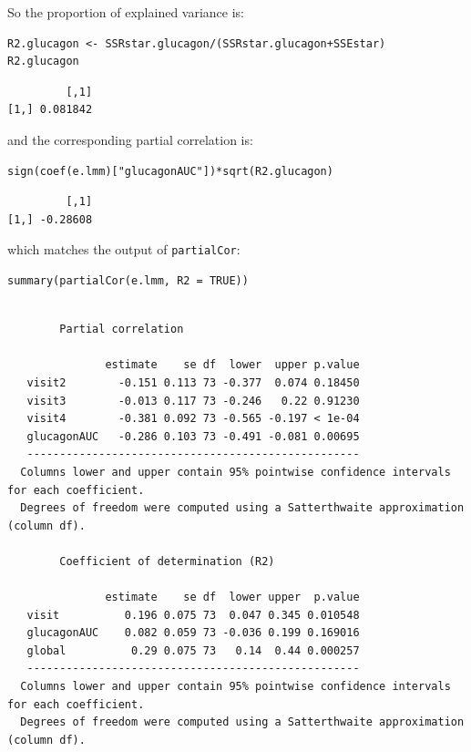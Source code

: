 \documentclass[12pt]{article}
\begin{document}
So the proportion of explained variance is:
\lstset{language=r,label= ,caption= ,captionpos=b,numbers=none}
\begin{lstlisting}
R2.glucagon <- SSRstar.glucagon/(SSRstar.glucagon+SSEstar)
R2.glucagon
\end{lstlisting}

\begin{verbatim}
         [,1]
[1,] 0.081842
\end{verbatim}


and the corresponding partial correlation is:
\lstset{language=r,label= ,caption= ,captionpos=b,numbers=none}
\begin{lstlisting}
sign(coef(e.lmm)["glucagonAUC"])*sqrt(R2.glucagon)
\end{lstlisting}

\begin{verbatim}
         [,1]
[1,] -0.28608
\end{verbatim}


which matches the output of \texttt{partialCor}:
\lstset{language=r,label= ,caption= ,captionpos=b,numbers=none}
\begin{lstlisting}
summary(partialCor(e.lmm, R2 = TRUE))
\end{lstlisting}

\begin{verbatim}

		Partial correlation 

               estimate    se df  lower  upper p.value
   visit2        -0.151 0.113 73 -0.377  0.074 0.18450
   visit3        -0.013 0.117 73 -0.246   0.22 0.91230
   visit4        -0.381 0.092 73 -0.565 -0.197 < 1e-04
   glucagonAUC   -0.286 0.103 73 -0.491 -0.081 0.00695
   --------------------------------------------------- 
  Columns lower and upper contain 95% pointwise confidence intervals for each coefficient.
  Degrees of freedom were computed using a Satterthwaite approximation (column df). 

		Coefficient of determination (R2)

               estimate    se df  lower upper  p.value
   visit          0.196 0.075 73  0.047 0.345 0.010548
   glucagonAUC    0.082 0.059 73 -0.036 0.199 0.169016
   global          0.29 0.075 73   0.14  0.44 0.000257
   --------------------------------------------------- 
  Columns lower and upper contain 95% pointwise confidence intervals for each coefficient.
  Degrees of freedom were computed using a Satterthwaite approximation (column df).
\end{verbatim}
\end{document}
